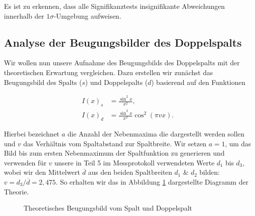 \documentclass{article}
\begin{document}
Es ist zu erkennen, dass alle Signifikanztests insignifikante Abweichungen innerhalb der $1\sigma$-Umgebung aufweisen. 

\clearpage
\newpage
\subsection{Analyse der Beugungsbilder des Doppelspalts}

Wir wollen nun unsere Aufnahme des Beugungsbilds des Doppelspalts mit der theoretischen Erwartung vergleichen. Dazu erstellen wir zunächst das Beugungsbild des Spalts ($s$) und Doppelspalts ($d$) basierend auf den Funktionen

\begin{equation}
    \begin{split}
        I(x)_s &= \frac{\sin^2{x}}{x^2}, \\
        I(x)_d &= \frac{\sin^2{x}}{x^2} \cos^2{(\pi v x)}.
    \end{split}
\end{equation}

Hierbei bezeichnet $a$ die Anzahl der Nebenmaxima die dargestellt werden sollen und $v$ das Verhältnis vom Spaltabstand zur Spaltbreite. Wir setzen $a=1$, um das Bild bis zum ersten Nebenmaximum der Spaltfunktion zu generieren und verwenden für $v$ unsere in Teil 5 im Messprotokoll verwendeten Werte $d_1$ bis $d_3$, wobei wir den Mittelwert $\overline{d}$ aus den beiden Spaltbreiten $d_1$ \& $d_2$ bilden: $v = d_3/\overline{d} = 2,475$. So erhalten wir das in Abbildung \ref{fig:Beug_d_s_theo} dargestellte Diagramm der Theorie. 

\begin{figure}[!b]
    \centering
    \caption{Theoretisches Beugungsbild vom Spalt und Doppelspalt}
    \label{fig:Beug_d_s_theo}
\end{figure}
\end{document}
